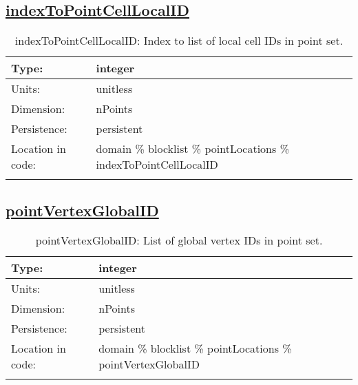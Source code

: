 \subsection[indexToPointCellLocalID]{\hyperref[sec:var_tab_pointLocations]{indexToPointCellLocalID}}
\label{subsec:var_sec_pointLocations_indexToPointCellLocalID}
\begin{center}
\begin{longtable}{| p{2.0in} | p{4.0in} |}
        \hline 
        Type: & integer \\
        \hline 
        Units: & \si{unitless} \\
        \hline 
        Dimension: & nPoints \\
        \hline 
        Persistence: & persistent \\
        \hline 
         Location in code: & domain \% blocklist \% pointLocations \% indexToPointCellLocalID \\
         \hline 
    \caption{indexToPointCellLocalID: Index to list of local cell IDs in point set.}
\end{longtable}
\end{center}
\subsection[pointVertexGlobalID]{\hyperref[sec:var_tab_pointLocations]{pointVertexGlobalID}}
\label{subsec:var_sec_pointLocations_pointVertexGlobalID}
\begin{center}
\begin{longtable}{| p{2.0in} | p{4.0in} |}
        \hline 
        Type: & integer \\
        \hline 
        Units: & \si{unitless} \\
        \hline 
        Dimension: & nPoints \\
        \hline 
        Persistence: & persistent \\
        \hline 
         Location in code: & domain \% blocklist \% pointLocations \% pointVertexGlobalID \\
         \hline 
    \caption{pointVertexGlobalID: List of global vertex IDs in point set.}
\end{longtable}
\end{center}
